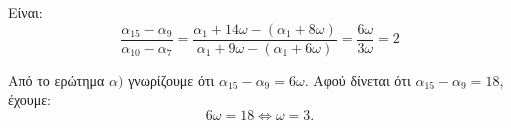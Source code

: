 
\begin{alist}
\item Είναι:
\[\dfrac{\alpha_{15} - \alpha_9}{\alpha_{10} - \alpha_7} = \dfrac{\alpha_1 + 14\omega - (\alpha_1 + 8\omega)}{\alpha_1 + 9\omega - (\alpha_1 + 6\omega)} = \dfrac{6\omega}{3\omega} = 2\]

\item 
Από το ερώτημα $\alpha)$ γνωρίζουμε ότι $\alpha_{15} - \alpha_9  = 6\omega$.
Αφού δίνεται ότι $\alpha_{15} - \alpha_9 = 18$, έχουμε:
\[6\omega = 18 \Leftrightarrow \omega = 3.\]
\end{alist}

